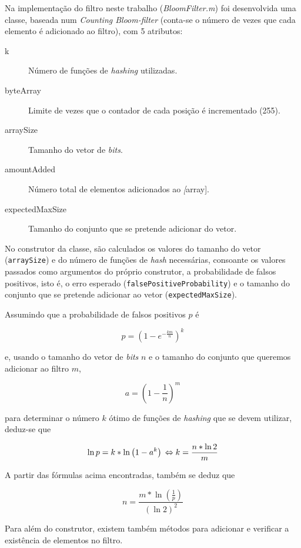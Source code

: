 \documentclass[a4paper,11pt,openright,oneside]{report}
\begin{document}
Na implementação do filtro neste trabalho (\textit{BloomFilter.m}) foi desenvolvida uma classe, baseada num \textit{Counting Bloom-filter} (conta-se o número de vezes que cada elemento é adicionado ao filtro), com 5 atributos:
\begin{description}
\item[k]
Número de funções de \textit{hashing} utilizadas.
\item[byteArray]
Limite de vezes que o contador de cada posição é incrementado (255).
\item[arraySize]
Tamanho do vetor de \textit{bits}.
\item[amountAdded]
Número total de elementos adicionados ao \textit[array].
\item[expectedMaxSize]
Tamanho do conjunto que se pretende adicionar do vetor.
\end{description}

No construtor da classe, são calculados os valores do tamanho do vetor (\texttt{arraySize}) e do número de funções de \textit{hash} necessárias, consoante os valores passados como argumentos do próprio construtor, a probabilidade de falsos positivos, isto é, o erro esperado (\texttt{falsePositiveProbability}) e o tamanho do conjunto que se pretende adicionar ao vetor (\texttt{expectedMaxSize}). 

Assumindo que a probabilidade de falsos positivos $p$ é

$$ p =  \left(1 - e^{-\frac{km}{n}}\right)^k $$

e, usando o tamanho do vetor de \textit{bits} $n$ e o tamanho do conjunto que queremos adicionar ao filtro $m$,

$$ a = \left(1 - \frac{1}{n}\right)^m $$

para determinar o número $k$ ótimo de funções de \textit{hashing} que se devem utilizar, deduz-se que

$$ \ln p = k * \ln \left(1 - a^k\right) \\
\Leftrightarrow k =  \frac{n * \ln 2}{m}$$

A partir das fórmulas acima encontradas, também se deduz que

$$ n = \frac{m * \ln \left(\frac{1}{p}\right)}{\left(\ln 2\right) ^ 2} $$

Para além do construtor, existem também métodos para adicionar e verificar a existência de elementos no filtro.
\end{document}
